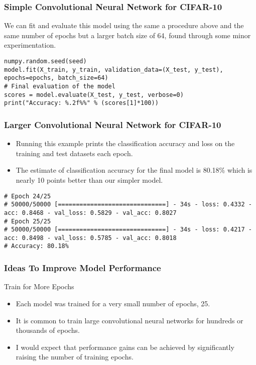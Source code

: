 \begin{frame}[fragile] \frametitle{Simple Convolutional Neural Network for CIFAR-10}
We can fit and evaluate this model using the same a procedure above and the same number of epochs but a larger batch size of 64, found through some minor experimentation.
\begin{lstlisting}
numpy.random.seed(seed)
model.fit(X_train, y_train, validation_data=(X_test, y_test), epochs=epochs, batch_size=64)
# Final evaluation of the model
scores = model.evaluate(X_test, y_test, verbose=0)
print("Accuracy: %.2f%%" % (scores[1]*100))
\end{lstlisting}

\end{frame}

\begin{frame}[fragile] \frametitle{Larger Convolutional Neural Network for CIFAR-10}
\begin{itemize}
\item Running this example prints the classification accuracy and loss on the training and test datasets each epoch. 
\item The estimate of classification accuracy for the final model is 80.18\% which is nearly 10 points better than our simpler model.
\end{itemize}
\begin{lstlisting}
# Epoch 24/25
# 50000/50000 [==============================] - 34s - loss: 0.4332 - acc: 0.8468 - val_loss: 0.5829 - val_acc: 0.8027
# Epoch 25/25
# 50000/50000 [==============================] - 34s - loss: 0.4217 - acc: 0.8498 - val_loss: 0.5785 - val_acc: 0.8018
# Accuracy: 80.18%
\end{lstlisting}
\end{frame}

\begin{frame}[fragile] \frametitle{Ideas To Improve Model Performance}
Train for More Epochs
\begin{itemize}
\item Each model was trained for a very small number of epochs, 25. 
\item It is common to train large convolutional neural networks for hundreds or thousands of epochs. 
\item I would expect that performance gains can be achieved by significantly raising the number of training epochs.
\end{itemize}
\end{frame}

